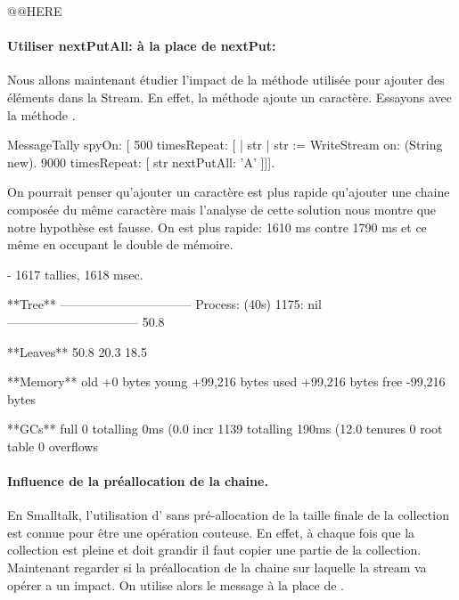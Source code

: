 \documentclass[a4paper,10pt,twoside]{book}
\begin{document}
@@HERE

\paragraph{Utiliser nextPutAll: \`a la place de nextPut:}
Nous allons maintenant \'etudier l'impact de la m\'ethode utilis\'ee
pour ajouter des \'el\'ements dans la Stream. En effet, la m\'ethode
 ajoute un caract\`ere. Essayons avec la m\'ethode
.

\begin{code}{}
MessageTally spyOn: 
    [ 500 timesRepeat: [
                    | str |  
                    str := WriteStream on: (String new). 
                    9000 timesRepeat: [ str nextPutAll: 'A' ]]].
\end{code}

On pourrait penser qu'ajouter un
caract\`ere est plus rapide qu'ajouter une chaine compos\'ee du m\^eme 
caract\`ere mais l'analyse de cette solution nous montre que notre
hypoth\`ese est fausse. On est plus rapide: 1610 ms contre 1790 ms
et ce m\^eme en occupant le double de m\'emoire. 

\begin{code}{}
 - 1617 tallies, 1618 msec.

**Tree**
--------------------------------
Process: (40s)  1175: nil
--------------------------------
50.8%

**Leaves**
50.8%
20.3%
18.5%

**Memory**
	old			+0 bytes
	young		+99,216 bytes
	used		+99,216 bytes
	free		-99,216 bytes

**GCs**
	full			0 totalling 0ms (0.0%
	incr		1139 totalling 190ms (12.0%
	tenures		0
	root table	0 overflows
\end{code}

\paragraph{Influence de la pr\'eallocation de la chaine.}
En Smalltalk, l'utilisation d' sans
pr\'e-allocation de la taille finale de la collection est connue pour
\^etre une op\'eration couteuse. En effet, \`a chaque fois que la
collection est pleine et doit grandir il faut copier une partie de la
collection. Maintenant regarder si la pr\'eallocation de la chaine
sur laquelle la stream va op\'erer a un impact. On utilise alors le
message  \`a la place de .
\end{document}
